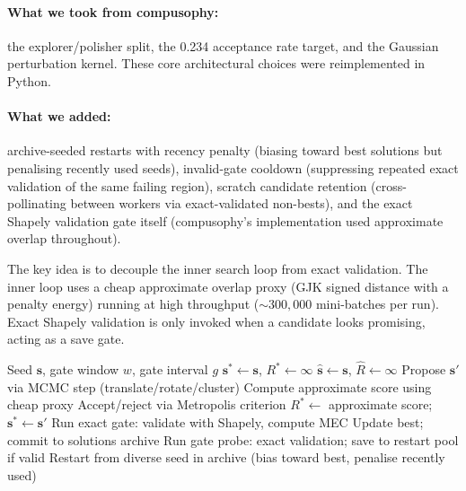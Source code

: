 \documentclass[11pt]{article}
\begin{document}
\paragraph{What we took from compusophy:} the explorer/polisher split, the 0.234 acceptance rate target, and the Gaussian perturbation kernel. These core architectural choices were reimplemented in Python.

\paragraph{What we added:} archive-seeded restarts with recency penalty (biasing toward best solutions but penalising recently used seeds), invalid-gate cooldown (suppressing repeated exact validation of the same failing region), scratch candidate retention (cross-pollinating between workers via exact-validated non-bests), and the exact Shapely validation gate itself (compusophy's implementation used approximate overlap throughout).

The key idea is to decouple the inner search loop from exact validation.
The inner loop uses a cheap approximate overlap proxy (GJK signed distance with a penalty energy) running at high throughput (${\sim}300{,}000$ mini-batches per run).
Exact Shapely validation is only invoked when a candidate looks promising, acting as a save gate.

\begin{algorithm}[t]
\caption{Fast Approximate MCMC with Exact Gate}\label{alg:fastmcmc}
\begin{algorithmic}[1]
\REQUIRE Seed $\mathbf{s}$, gate window $w$, gate interval $g$
\STATE $\mathbf{s}^* \gets \mathbf{s}$, $R^* \gets \infty$ 
\STATE $\hat{\mathbf{s}} \gets \mathbf{s}$, $\hat{R} \gets \infty$ 
  \STATE Propose $\mathbf{s}'$ via MCMC step (translate/rotate/cluster)
  \STATE Compute approximate score using cheap proxy
  \STATE Accept/reject via Metropolis criterion
    \STATE $R^* \gets$ approximate score; $\mathbf{s}^* \gets \mathbf{s}'$
    \STATE Run exact gate: validate with Shapely, compute MEC
      \STATE Update best; commit to solutions archive
    \ENDIF
    \STATE Run gate probe: exact validation; save to restart pool if valid
  \ENDIF
    \STATE Restart from diverse seed in archive (bias toward best, penalise recently used)
  \ENDIF
\ENDFOR
\end{algorithmic}
\end{algorithm}
\end{document}

